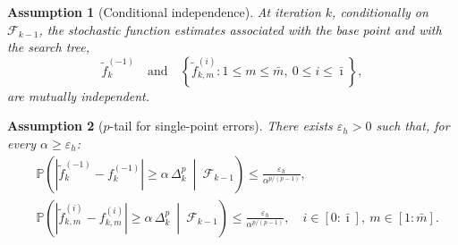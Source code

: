 \documentclass[11pt,a4paper]{article}
\newtheorem{assumption}{Assumption}[section]
\newcommand{\F}{\mathcal{F}}
\newcommand{\Imax}{\bar{\imath}}%
\newcommand{\Dexp}{p}
\newcommand{\aexp}{\Dexp/(\Dexp-1)}
\begin{document}
\begin{assumption}[Conditional independence]\label{ass:indep}
At iteration \(k\), conditionally on \(\mathcal F_{k-1}\), the stochastic
function estimates associated with the base point and with the search
tree,
\[
    \tilde f_k^{(-1)}
    \quad\text{and}\quad
    \left\{
        \tilde f_{k,m}^{(i)}
        :
        1\le m\le \bar{m},\ 0\le i\le \Imax
    \right\},
\]
are mutually independent.
\end{assumption}
\begin{assumption}[$\Dexp$-tail for single-point errors]\label{ass:quadratic tail}
There exists $\varepsilon_h>0$ such that, for every $\alpha\ge \varepsilon_h$:
\begin{equation}\label{eq:A4}
\begin{aligned}
&\mathbb P\!\left(
|\tilde f_{k}^{(-1)}-f_{k}^{(-1)}|
\ge
\alpha\,\Delta_k^{\Dexp}
\ \middle|\ 
\F_{k-1}
\right)
\le
\frac{\varepsilon_h}{\alpha^{\aexp}},
\\[1mm]
&\mathbb P\!\left(
|\tilde f_{k,m}^{(i)}-f_{k,m}^{(i)}|
\ge
\alpha\,\Delta_k^{\Dexp}
\ \middle|\ 
\F_{k-1}
\right)
\le
\frac{\varepsilon_h}{\alpha^{\aexp}},
\quad
i\in[0:\Imax],\ m\in[1:\bar{m}].
\end{aligned}
\end{equation}


\end{assumption}
\end{document}
